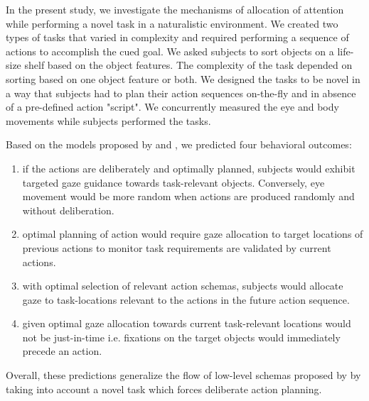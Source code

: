 In the present study, we investigate the mechanisms of allocation of attention while performing a novel task in a naturalistic environment. We created two types of tasks that varied in complexity and required performing a sequence of actions to accomplish the cued goal. We asked subjects to sort objects on a life-size shelf based on the object features. The complexity of the task depended on sorting based on one object feature or both. We designed the tasks to be novel in a way that subjects had to plan their action sequences on-the-fly and in absence of a pre-defined action "script". We concurrently measured the eye and body movements while subjects performed the tasks. 

Based on the models proposed by \citet{Land2001-do} and \citet{Norman1986-qb}, we predicted four behavioral outcomes:
\begin{enumerate}
    \item if the actions are deliberately and optimally planned, subjects would exhibit targeted gaze guidance towards task-relevant objects. Conversely, eye movement would be more random when actions are produced randomly and without deliberation.
    \item optimal planning of action would require gaze allocation to target locations of previous actions to monitor task requirements are validated by current actions.
    \item with optimal selection of relevant action schemas, subjects would allocate gaze to task-locations relevant to the actions in the future action sequence.
    \item given optimal gaze allocation towards current task-relevant locations would not be just-in-time i.e. fixations on the target objects would immediately precede an action. 
\end{enumerate}

Overall, these predictions generalize the flow of low-level schemas proposed by \citet{Land2001-do} by taking into account a novel task which forces deliberate action planning.



